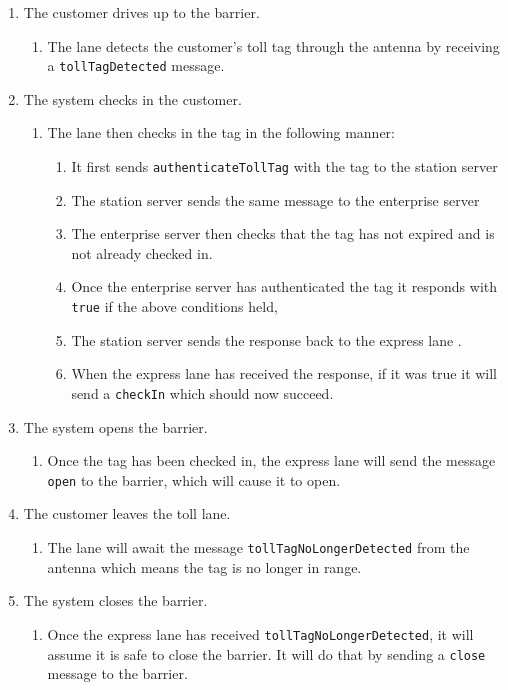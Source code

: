 \begin{enumerate}
\item The customer drives up to the barrier.

\begin{enumerate}
\item The lane detects the customer's toll tag through the antenna by receiving
a \texttt{tollTagDetected} message.
\end{enumerate}
\item The system checks in the customer.

\begin{enumerate}
\item The lane then checks in the tag in the following manner: 

\begin{enumerate}
\item It first sends \texttt{authenticateTollTag} with the tag to the station server
\item The station server sends the same message to the enterprise server
\item The enterprise server then checks that the tag has not expired and
is not already checked in.
\item Once the enterprise server has authenticated the tag it responds with
\texttt{true} if the above conditions held,
\item The station server sends the response back to the express lane .
\item When the express lane has received the response, if it was true it
will send a \texttt{checkIn} which should now succeed.
\end{enumerate}
\end{enumerate}
\item The system opens the barrier.

\begin{enumerate}
\item Once the tag has been checked in, the express lane will send the message
\texttt{open} to the barrier, which will cause it to open.
\end{enumerate}
\item The customer leaves the toll lane.

\begin{enumerate}
\item The lane will await the message \texttt{tollTagNoLongerDetected} from the antenna
which means the tag is no longer in range.
\end{enumerate}
\item The system closes the barrier.

\begin{enumerate}
\item Once the express lane has received \texttt{tollTagNoLongerDetected}, it will assume
it is safe to close the barrier. It will do that by sending a \texttt{close}
message to the barrier.\end{enumerate}
\end{enumerate}
